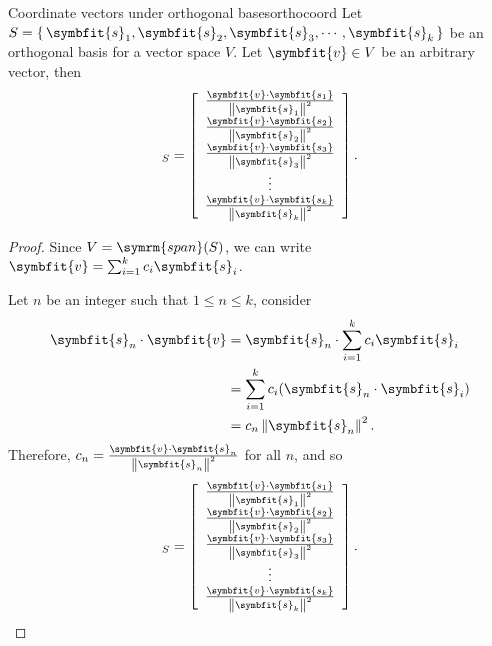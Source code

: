 \documentclass[math]{amznotes}
\theoremstyle{remark}
\begin{document}
\begin{thmbox}{Coordinate vectors under orthogonal bases}{orthocoord}
    Let $S = \left\{\, \symbfit{s}_1, \symbfit{s}_2, \symbfit{s}_3, \cdots, \symbfit{s}_k \,\right\}$ be an orthogonal basis for a vector space $V$. Let $\symbfit{v} \in V$ be an arbitrary vector, then
    \begin{displaymath}
        [\symbfit{v}]_S = \left[\begin{array}{c}
                \frac{\symbfit{v} \cdot \symbfit{s_1}}{\left\lVert \symbfit{s}_1 \right\rVert^2} \\
                \frac{\symbfit{v} \cdot \symbfit{s_2}}{\left\lVert \symbfit{s}_2 \right\rVert^2} \\
                \frac{\symbfit{v} \cdot \symbfit{s_3}}{\left\lVert \symbfit{s}_3 \right\rVert^2} \\
                \vdots                                                                           \\
                \frac{\symbfit{v} \cdot \symbfit{s_k}}{\left\lVert \symbfit{s}_k \right\rVert^2} \\
            \end{array}\right].
    \end{displaymath}
    \tcblower
    \begin{proof}
        Since $V = \symrm{span}(S)$, we can write $\symbfit{v} = \sum_{i = 1}^{k} c_i \symbfit{s}_i$.

        Let $n$ be an integer such that $1 \leq n \leq k$, consider
        \begin{align*}
            \symbfit{s}_n \cdot \symbfit{v} & = \symbfit{s}_n \cdot \sum_{i = 1}^{k} c_i \symbfit{s}_i  \\
                                            & = \sum_{i = 1}^{k} c_i(\symbfit{s}_n \cdot \symbfit{s}_i) \\
                                            & = c_n \left\lVert \symbfit{s}_n \right\rVert^2.
        \end{align*}
        Therefore, $c_n = \frac{\symbfit{v} \cdot \symbfit{s}_n}{\left\lVert \symbfit{s}_n \right\rVert^2}$ for all $n$, and so
        \begin{displaymath}
            [\symbfit{v}]_S = \left[\begin{array}{c}
                    \frac{\symbfit{v} \cdot \symbfit{s_1}}{\left\lVert \symbfit{s}_1 \right\rVert^2} \\
                    \frac{\symbfit{v} \cdot \symbfit{s_2}}{\left\lVert \symbfit{s}_2 \right\rVert^2} \\
                    \frac{\symbfit{v} \cdot \symbfit{s_3}}{\left\lVert \symbfit{s}_3 \right\rVert^2} \\
                    \vdots                                                                           \\
                    \frac{\symbfit{v} \cdot \symbfit{s_k}}{\left\lVert \symbfit{s}_k \right\rVert^2} \\
                \end{array}\right].
        \end{displaymath}
    \end{proof}
\end{thmbox}
\end{document}
